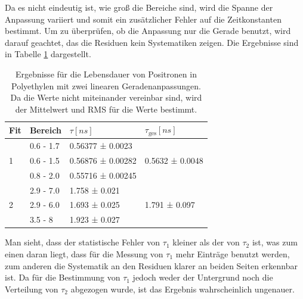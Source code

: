 \documentclass[a4paper,12pt]{article}
\begin{document}
Da es nicht eindeutig ist, wie groß die Bereiche sind, wird die Spanne der
Anpassung variiert und somit ein zusätzlicher Fehler auf die Zeitkonstanten bestimmt.
Um zu überprüfen, ob die Anpassung nur die Gerade benutzt, wird darauf geachtet, das die Residuen
kein Systematiken zeigen.
Die Ergebnisse sind in Tabelle \ref{tab:linearPoly} dargestellt.

\begin{table}
	\begin{tabular}{l |l l ||l}
			Fit& Bereich & $τ [\si{ns}]$ & $τ_\text{ges} [\si{ns}]$ \\
		\hline
		\multirow{3}{*}{1} &0.6 - 1.7&  0.56377 ± 0.0023  &\multirow{3}{*}{0.5632 ± 0.0048}\\
			 &0.6 - 1.5&  0.56876 ± 0.00282 &\\
			 &0.8 - 2.0&  0.55716 ± 0.00245 &\\
		\hline
		\multirow{3}{*}{2} & 2.9 - 7.0 &  1.758 ± 0.021 &\multirow{3}{*}{1.791 ± 0.097}\\
			&2.9 - 6.0&  1.693 ± 0.025 & \\
			&3.5 - 8&  1.923 ± 0.027  &
	\end{tabular}
	\centering
	\caption{Ergebnisse für die Lebensdauer von Positronen in Polyethylen mit zwei linearen
		Geradenanpassungen. Da die Werte nicht miteinander vereinbar sind, wird der Mittelwert und
	RMS für die Werte bestimmt.}
	\label{tab:linearPoly}
\end{table}

Man sieht, dass der statistische Fehler von $τ_1$ kleiner als der von $τ_2$ ist, was zum einen daran
liegt, dass für die Messung von $τ_1$ mehr Einträge benutzt werden, zum anderen die Systematik an
den Residuen klarer an beiden Seiten erkennbar ist. Da für die Bestimmung von $τ_1$ jedoch weder der
Untergrund noch die Verteilung von $τ_2$ abgezogen wurde, ist das Ergebnis wahrscheinlich ungenauer.

\FloatBarrier
\end{document}

